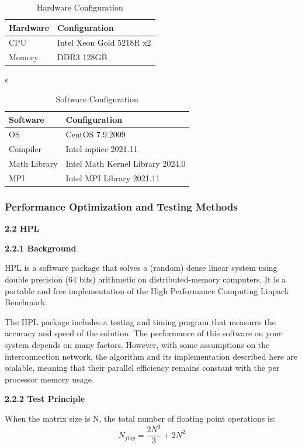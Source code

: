 \documentclass[a4paper,12pt]{article}
\begin{document}
\begin{table}[H]
\centering
\vspace{0.5cm}
\begin{tabular}{ll}
\toprule
Hardware & Configuration \\
\midrule
CPU & Intel Xeon Gold 5218R x2 \\
Memory & DDR3 128GB \\
\bottomrule
\end{tabular}
\caption{Hardware Configuration}s
\end{table}

\begin{table}[H]
\centering
\vspace{0.5cm}
\begin{tabular}{ll}
\toprule
Software & Configuration \\
\midrule
OS & CentOS 7.9.2009 \\
Compiler & Intel mpiicc 2021.11 \\
Math Library & Intel Math Kernel Library 2024.0 \\
MPI & Intel MPI Library 2021.11 \\
\bottomrule
\end{tabular}
\caption{Software Configuration}
\end{table}


\subsubsection{Performance Optimization and Testing Methods}

\textbf{2.2 HPL}

\textbf{2.2.1 Background}

HPL is a software package that solves a (random) dense linear system using double precision (64 bits) arithmetic on distributed-memory computers. It is a portable and free implementation of the High Performance Computing Linpack Benchmark.

The HPL package includes a testing and timing program that measures the accuracy and speed of the solution. The performance of this software on your system depends on many factors. However, with some assumptions on the interconnection network, the algorithm and its implementation described here are scalable, meaning that their parallel efficiency remains constant with the per processor memory usage.

\textbf{2.2.2 Test Principle}

When the matrix size is N, the total number of floating point operations is:
\begin{equation}
    \boxed{N_{flop} = \frac{2N^3}{3} + 2N^2}
\end{equation}
\end{document}
